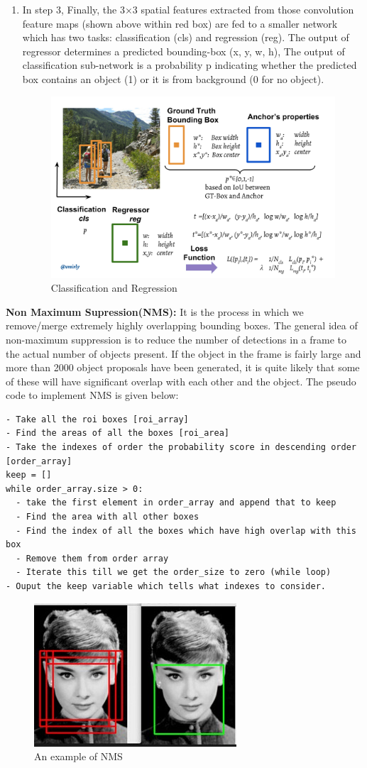 \documentclass[12pt]{article}
\begin{document}
\begin{enumerate}
	\item In step 3, Finally, the 3×3 spatial features extracted from those convolution feature maps (shown above within red box) are fed to a smaller network which has two tasks: classification (cls) and regression (reg). The output of regressor determines a predicted bounding-box (x, y, w, h), The output of classification sub-network is a probability p indicating whether the predicted box contains an object (1) or it is from background (0 for no object).
\begin{figure}[H]
\centering
  \includegraphics[width=0.5\linewidth]{./Images/RPN3.png}
  \caption{Classification and Regression}
  \label{fig:RPN3}
\end{figure}
\end{enumerate} 

\textbf{Non Maximum Supression(NMS):} It is the process in which we remove/merge extremely highly overlapping bounding boxes. The general idea of non-maximum suppression is to reduce the number of detections in a frame to the actual number of objects present. If the object in the frame is fairly large and more than 2000 object proposals have been generated, it is quite likely that some of these will have significant overlap with each other and the object. The pseudo code to implement NMS is given below: 
\begin{verbatim}
- Take all the roi boxes [roi_array]
- Find the areas of all the boxes [roi_area]
- Take the indexes of order the probability score in descending order [order_array]
keep = []
while order_array.size > 0:
  - take the first element in order_array and append that to keep  
  - Find the area with all other boxes
  - Find the index of all the boxes which have high overlap with this box
  - Remove them from order array
  - Iterate this till we get the order_size to zero (while loop)
- Ouput the keep variable which tells what indexes to consider.
\end{verbatim}
\begin{figure}[H]
\centering
  \includegraphics[width=0.5\linewidth]{./Images/NMS.jpg}
  \caption{An example of NMS }
  \label{fig:NMS}
\end{figure}
\end{document}
